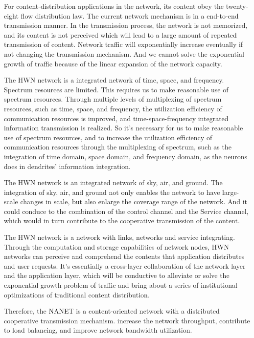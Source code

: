 \documentclass[journal,comsoc]{IEEEtran}
\begin{document}
				For content-distribution applications in the network, its content obey the twenty-eight flow distribution law.
				The current network mechanism is in a end-to-end transmission manner. 
				In the transmission process, the network is not memorized, and its content is not perceived which will lead to a large amount of repeated transmission of content.
				Network traffic will exponentially increase eventually if not changing the transmission mechanism. 
				And we cannot solve the exponential growth of traffic because of the linear expansion of the network capacity.
				
				The HWN network is a integrated network of time, space, and frequency.
				Spectrum resources are limited. This requires us to make reasonable use of spectrum resources.
				Through multiple levels of multiplexing of spectrum resources, such as time, space, and frequency, the utilization efficiency of communication resources is improved, and time-space-frequency integrated information transmission is realized.
				So it's necessary for us to make reasonable use of spectrum resources, and to increase the utilization efficiency of communication resources through the multiplexing of spectrum, such as the integration of time domain, space domain, and frequency domain, as the neurons does in dendrites' information integration.
				
				The HWN network is an integrated network of sky, air, and ground. 
				The integration of sky, air, and ground not only enables the network to have large-scale changes in scale,
				but also enlarge the coverage range of the network.
				And it could conduce to the combination of the control channel and the Service channel, which would in turn contribute to the cooperative transmission of the content.
				
				The HWN network is a network with links, networks and service integrating.
				Through the computation and storage capabilities of network nodes, HWN networks can perceive and comprehend the contents that application distributes and user requests.
				It's essentially a cross-layer collaboration of the network layer and the application layer, 
				which will be conductive to alleviate or solve the exponential growth problem of traffic and bring about a series of  institutional optimizations of traditional content distribution.
				
				Therefore, the NANET is a content-oriented network with a distributed cooperative transmission mechanism. increase the network throughput, 
				contribute to load balancing, and improve network bandwidth utilization.
				
\end{document}
